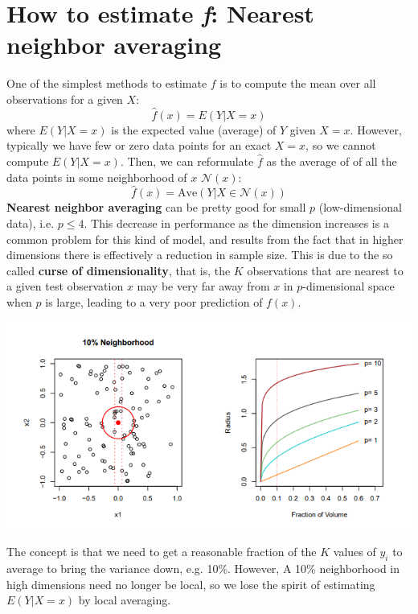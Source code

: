 \section{How to estimate \textit{f}: Nearest neighbor averaging}
One of the simplest methods to estimate $f$ is to compute the mean over all observations for a given $X$:
\[\hat{f}(x) = E(Y | X = x)\]
where $E(Y | X = x)$ is the expected value (average) of $Y$ given $X = x$. However, typically we have few or zero data points for an exact $X = x$, so we cannot compute $E(Y|X=x)$. Then, we can reformulate $\hat{f}$ as the average of of all the data points in some neighborhood of $x$ $\mathcal{N}(x)$:
\[\hat{f}(x) = \text{Ave}(Y | X \in \mathcal{N}(x))\]
\textbf{Nearest neighbor averaging} can be pretty good for small $p$ (low-dimensional data), i.e. $p \leq 4$. This decrease in performance as the dimension increases is a common problem for this kind of model, and results from the fact that in higher dimensions there is effectively a reduction in sample size. This is due to the so called \textbf{curse of dimensionality}, that is, the $K$ observations that are nearest to a given test observation $x$ may be very far away from $x$ in $p$-dimensional space when $p$ is large, leading to a very poor prediction of $f(x)$.
\begin{center}
    \includegraphics[]{images/curse dimensionality.png}
\end{center}
The concept is that we need to get a reasonable fraction of the $K$ values of $y_i$ to average to bring the variance down, e.g. 10\%. However, A 10\% neighborhood in high dimensions need no longer be local, so we lose the spirit of estimating $E(Y|X=x)$ by local averaging.


